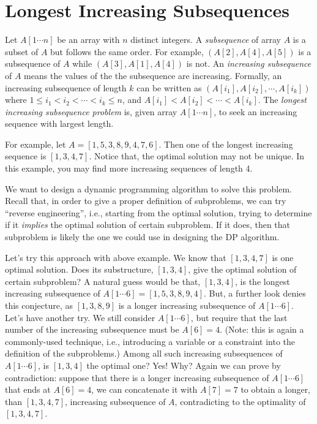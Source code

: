 \documentclass[letterpaper,11pt]{article}
\theoremstyle{mytheorem}
\begin{document}
\section*{Longest Increasing Subsequences}

Let $A[1\cdots n]$ be an array with $n$ distinct integers.
A \emph{subsequence} of array $A$ is a subset of $A$ but follows
the same order. For example, $(A[2], A[4], A[5])$ is a subsequence of $A$
while $(A[3], A[1], A[4])$ is not.
An \emph{increasing subsequence} of $A$ means the values of the
the subsequence are increasing.
Formally, an increasing subsequence of length $k$ can be written
as $(A[i_1], A[i_2], \cdots, A[i_k])$ where $1\le i_1 < i_2 < \cdots < i_k \le n$,
and $A[i_1] < A[i_2] < \cdots < A[i_k]$.
The \emph{longest increasing subsequence problem} is, given array $A[1\cdots n]$,
to seek an increasing sequence with largest length.

For example, let $A = [1, 5, 3, 8, 9, 4, 7, 6]$. Then one of the longest
increasing sequence is $[1, 3, 4, 7]$. Notice that, the optimal solution
may not be unique. In this example, you may find more increasing sequences 
of length 4.

We want to design a dynamic programming algorithm to solve this problem.
Recall that, in order to give a proper definition of subproblems,
we can try ``reverse engineering'', i.e., starting from the optimal
solution, trying to determine if it \emph{implies} the optimal solution
of certain subproblem. If it does, then that subproblem is likely the one
we could use in designing the DP algorithm.

Let's try this approach with above example. We know that $[1, 3, 4, 7]$
is one optimal solution. Does its substructure, $[1, 3, 4]$, give the optimal
solution of certain subproblem? A natural guess would be that, $[1, 3, 4]$,
is the longest increasing subsequence of $A[1\cdots 6] = [1, 5, 3, 8, 9, 4]$.
But, a further look denies this conjecture, as $[1, 3, 8, 9]$ is a longer
increasing subsequence of $A[1\cdots 6]$.
Let's have another try. We still consider $A[1\cdots 6]$, but require that
the last number of the increasing subsequence must be $A[6] = 4$.
(Note: this is again a commonly-used technique, i.e., introducing a variable or a constraint
into the definition of the subproblems.)
Among all such increasing subsequences of $A[1\cdots 6]$, is $[1, 3, 4]$ the optimal one?
Yes! Why? Again we can prove by contradiction: suppose that there is a longer increasing subsequence of $A[1\cdots 6]$
that ends at $A[6] = 4$, we can concatenate it with $A[7] = 7$ to obtain 
a longer, than $[1, 3, 4, 7]$, increasing subsequence of $A$, contradicting
to the optimality of $[1, 3, 4, 7]$.
\end{document}
